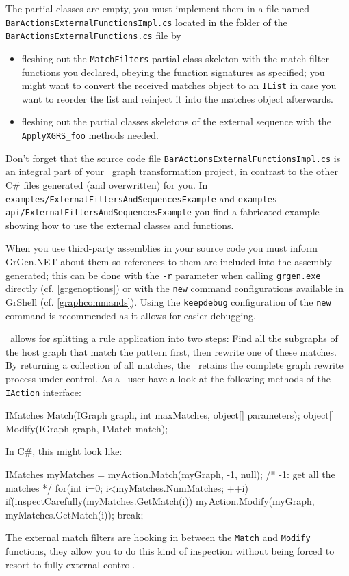 \noindent The partial classes are empty, you must implement them in a file named \texttt{BarActionsExternal\-FunctionsImpl.cs} located in the folder of the \texttt{BarActionsExternalFunctions.cs} file by
\begin{itemize}
	\item fleshing out the \texttt{MatchFilters} partial class skeleton with the match filter functions you declared, obeying the function signatures as specified; you might want to convert the received matches object to an \texttt{IList} in case you want to reorder the list and reinject it into the matches object afterwards.
	\item fleshing out the partial classes skeletons of the external sequence with the \texttt{ApplyXGRS\_foo} methods needed.
\end{itemize}

\noindent Don't forget that the source code file \texttt{BarActionsExternalFunctionsImpl.cs} is an integral part of your \GrG~graph transformation project, in contrast to the other C\# files generated (and overwritten) for you.
In \texttt{examples/ExternalFiltersAndSequencesExample} and \texttt{examples-api/ExternalFiltersAndSequencesExample}
you find a fabricated example showing how to use the external classes and functions.

When you use third-party assemblies in your source code you must inform GrGen.NET about them so references to them are included into the assembly generated; this can be done with the \texttt{-r} parameter when calling \texttt{grgen.exe} directly (cf. \ref{grgenoptions}) or with the \texttt{new} command configurations available in GrShell (cf. \ref{graphcommands}). Using the \texttt{keepdebug} configuration of the \texttt{new} command is recommended as it allows for easier debugging.


\begin{note}\label{note:inspect}
\LibGr\ allows for splitting a rule application into two steps:
Find all the subgraphs of the host graph that match the pattern first, then rewrite one of these matches. 
By returning a collection of all matches, the \LibGr\ retains the complete graph rewrite process under control.
As a \LibGr\ user have a look at the following methods of the \texttt{IAction} interface:
\begin{csharplet}
IMatches Match(IGraph graph, int maxMatches, object[] parameters);
object[] Modify(IGraph graph, IMatch match);
\end{csharplet}

In C\#, this might look like:
\begin{csharplet}
IMatches myMatches = myAction.Match(myGraph, -1, null); /* -1: get all the matches */
for(int i=0; i<myMatches.NumMatches; ++i)
{
	if(inspectCarefully(myMatches.GetMatch(i))
	{
		myAction.Modify(myGraph, myMatches.GetMatch(i));
		break;
  	}
}
\end{csharplet}

The external match filters are hooking in between the \texttt{Match} and \texttt{Modify} functions, they allow you to do this kind of inspection without being forced to resort to fully external control.
\end{note}

